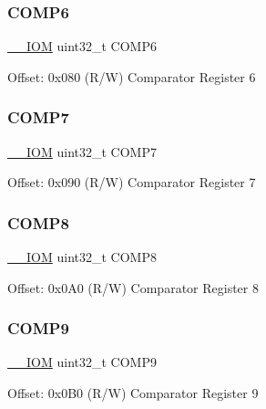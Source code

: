 \subsubsection{\texorpdfstring{C\+O\+M\+P6}{COMP6}}
{\footnotesize\ttfamily \mbox{\hyperlink{core__cm4_8h_ab6caba5853a60a17e8e04499b52bf691}{\+\_\+\+\_\+\+I\+OM}} uint32\+\_\+t C\+O\+M\+P6}

Offset\+: 0x080 (R/W) Comparator Register 6 \mbox{\label{struct_d_w_t___type_a26932a20b1cd18331bbe245caf8a6a92}} 
\subsubsection{\texorpdfstring{C\+O\+M\+P7}{COMP7}}
{\footnotesize\ttfamily \mbox{\hyperlink{core__cm4_8h_ab6caba5853a60a17e8e04499b52bf691}{\+\_\+\+\_\+\+I\+OM}} uint32\+\_\+t C\+O\+M\+P7}

Offset\+: 0x090 (R/W) Comparator Register 7 \mbox{\label{struct_d_w_t___type_a9b9d9bb4b4ecab022a3d88d9cae6b5e0}} 
\subsubsection{\texorpdfstring{C\+O\+M\+P8}{COMP8}}
{\footnotesize\ttfamily \mbox{\hyperlink{core__cm4_8h_ab6caba5853a60a17e8e04499b52bf691}{\+\_\+\+\_\+\+I\+OM}} uint32\+\_\+t C\+O\+M\+P8}

Offset\+: 0x0\+A0 (R/W) Comparator Register 8 \mbox{\label{struct_d_w_t___type_a4e090c0e6b818b63724c774f38ccab14}} 
\subsubsection{\texorpdfstring{C\+O\+M\+P9}{COMP9}}
{\footnotesize\ttfamily \mbox{\hyperlink{core__cm4_8h_ab6caba5853a60a17e8e04499b52bf691}{\+\_\+\+\_\+\+I\+OM}} uint32\+\_\+t C\+O\+M\+P9}

Offset\+: 0x0\+B0 (R/W) Comparator Register 9 \mbox{\label{struct_d_w_t___type_a29ca657c77928334be08a2e6555be950}} 

